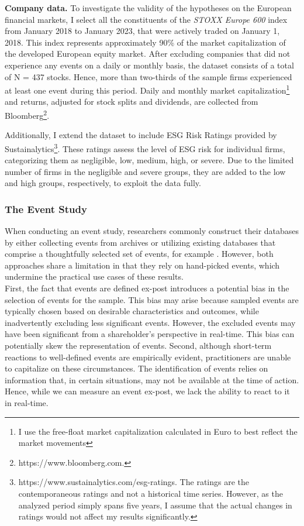 \noindent \textbf{Company data.} To investigate the validity of the hypotheses on the European financial markets, I select all the constituents of the \textit{STOXX Europe 600} index from January 2018 to January 2023, that were actively traded on January 1, 2018. This index represents approximately 90\% of the market capitalization of the developed European equity market. After excluding companies that did not experience any events on a daily or monthly basis, the dataset consists of a total of N = 437 stocks. Hence, more than two-thirds of the sample firms experienced at least one event during this period. Daily and monthly market capitalization\footnote{I use the free-float market capitalization calculated in Euro to best reflect the market movements} and returns, adjusted for stock splits and dividends, are collected from Bloomberg\footnote{https://www.bloomberg.com.}. 

Additionally, I extend the dataset to include ESG Risk Ratings provided by Sustainalytics\footnote{https://www.sustainalytics.com/esg-ratings. The ratings are the contemporaneous ratings and not a historical time series. However, as the analyzed period simply spans five years, I assume that the actual changes in ratings would not affect my results significantly.}. These ratings assess the level of ESG risk for individual firms, categorizing them as negligible, low, medium, high, or severe. Due to the limited number of firms in the negligible and severe groups, they are added to the low and high groups, respectively, to exploit the data fully. 

\subsubsection{The Event Study}

When conducting an event study, researchers commonly construct their databases by either collecting events from archives or utilizing existing databases that comprise a thoughtfully selected set of events, for example \cite{flammer2013corporate}. However, both approaches share a limitation in that they rely on hand-picked events, which undermine the practical use cases of these results. \\
First, the fact that events are defined ex-post introduces a potential bias in the selection of events for the sample. This bias may arise because sampled events are typically chosen based on desirable characteristics and outcomes, while inadvertently excluding less significant events. However, the excluded events may have been significant from a shareholder's perspective in real-time. This bias can potentially skew the representation of events. Second, although short-term reactions to well-defined events are empirically evident, practitioners are unable to capitalize on these circumstances. The identification of events relies on information that, in certain situations, may not be available at the time of action. Hence, while we can measure an event ex-post, we lack the ability to react to it in real-time. 

